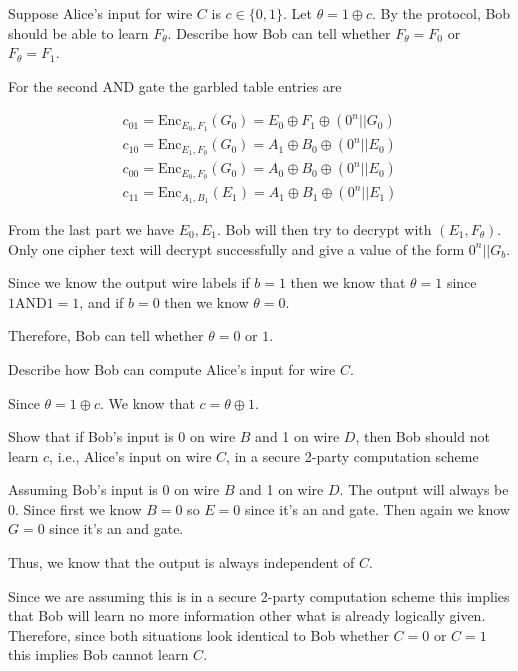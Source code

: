 \documentclass[12pt, letterpaper]{article}
\renewcommand{\t}[1]{\text{#1}}
\begin{document}
\begin{subproblem}{}
    Suppose Alice's input for wire $C$ is $c\in\{0,1\}$. Let $\theta = 1 \oplus c$. By the protocol, Bob should be able to learn $F_{\theta}$. Describe how Bob can tell whether $F_{\theta} = F_0$ or $F_{\theta} = F_1$.
\end{subproblem}
\begin{problemproof}
    For the second AND gate the garbled table entries are

    \[
    \begin{array}{c}
    c_{01} = \text{Enc}_{E_0,F_1}(G_0) = E_0 \oplus F_1 \oplus (0^n || G_0)\\
    c_{10} = \text{Enc}_{E_1,F_0}(G_0) = A_1 \oplus B_0 \oplus (0^n || E_0)\\
    c_{00} = \text{Enc}_{E_0,F_0}(G_0) = A_0 \oplus B_0 \oplus (0^n || E_0)\\
    c_{11} = \text{Enc}_{A_1,B_1}(E_1) = A_1 \oplus B_1 \oplus (0^n || E_1)
    \end{array}
    \]

    From the last part we have $E_0,E_1$. Bob will then try to decrypt with $(E_1,F_\theta)$.
    Only one cipher text will decrypt successfully and give a value of the form $0^n || G_b$.

    Since we know the output wire labels if $b=1$ then we know that $\theta = 1$ since $1 \t{AND} 1 = 1$, and if $b=0$ then we know $\theta=0$.

    Therefore, Bob can tell whether $\theta=0$ or $1$.
\end{problemproof}

\begin{subproblem}{}
    Describe how Bob can compute Alice's input for wire $C$.
\end{subproblem}
\begin{problemproof}
    Since $\theta = 1 \oplus c$. We know that $c = \theta \oplus 1$.
\end{problemproof}

\begin{subproblem}{}
    Show that if Bob's input is 0 on wire $B$ and 1 on wire $D$, then Bob should not learn $c$,
i.e., Alice's input on wire $C$, in a secure 2-party computation scheme
\end{subproblem}
\begin{problemproof}
    Assuming Bob's input is 0 on wire $B$ and 1 on wire $D$. The output will always be 0. Since first we know $B=0$ so $E=0$ since it's an and gate. Then again we know $G=0$ since it's an and gate.

    Thus, we know that the output is always independent of $C$.

    Since we are assuming this is in a secure 2-party computation scheme this implies that Bob will learn no more information other what is already logically given. Therefore, since both situations look identical to Bob whether $C=0$ or $C=1$ this implies Bob cannot learn $C$.
\end{problemproof}
\end{document}
